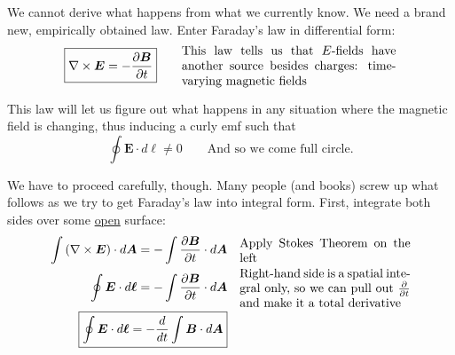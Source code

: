 \documentclass{article}
\numberwithin{equation}{section}
\newcommand{\rockandroll}[1][]{%
    \tikz \fill [scale=1ex/500,yscale=1,#1] svg "M3263 7664 c-94 -35 -191 -161 -208 -270 -15 -101 51 -340 173 -622 56 -129 69 -168 71 -217 3 -112 57 -456 102 -657 10 -48 19 -119 19 -158 0 -88 22 -248 66 -470 18 -96 34 -178 34 -182 0 -4 -45 42 -100 102 -124 135 -167 170 -255 212 -130 60 -280 48 -376 -32 -97 -79 -139 -192 -146 -396 l-6 -142 -68 68 c-191 191 -437 197 -625 15 -63 -62 -74 -100 -81 -297 -3 -76 -9 -138 -12 -138 -3 1 -22 22 -43 48 -20 26 -89 108 -155 182 -65 74 -149 178 -187 230 -38 52 -116 156 -173 230 -87 114 -113 157 -167 276 -230 512 -463 751 -667 683 -169 -57 -143 -331 81 -844 99 -227 128 -278 400 -700 43 -66 103 -165 135 -220 68 -118 241 -375 408 -605 124 -170 137 -196 137 -267 0 -85 83 -644 121 -811 6 -26 17 -105 25 -177 36 -308 129 -596 312 -962 144 -287 345 -606 493 -784 21 -25 65 -103 97 -175 33 -71 110 -232 171 -358 l111 -229 143 6 c78 3 590 16 1137 28 547 12 996 23 998 24 1 1 -13 27 -33 56 -117 177 -512 1052 -599 1327 -35 111 -34 162 13 492 73 510 91 717 91 1061 0 124 -5 286 -10 360 -26 330 -100 823 -185 1219 -63 299 -72 344 -94 520 -25 191 -82 423 -168 680 -36 107 -76 242 -89 299 -29 129 -76 275 -159 496 -35 94 -66 190 -70 215 -24 166 -181 554 -285 705 -106 153 -255 224 -377 179z m148 -45 c55 -19 125 -75 175 -142 54 -71 195 -355 249 -502 21 -55 47 -140 60 -190 12 -49 45 -154 74 -233 61 -169 134 -419 151 -517 7 -38 39 -153 71 -254 95 -293 158 -568 184 -803 l6 -57 -151 0 c-119 0 -315 -15 -327 -25 -1 -1 87 -2 195 -2 108 -1 217 -5 242 -10 52 -11 40 24 115 -337 67 -323 122 -656 154 -937 36 -306 44 -478 38 -795 -6 -326 -19 -487 -72 -900 -44 -335 -44 -367 -4 -492 68 -212 284 -719 469 -1100 l108 -222 -31 -5 c-18 -3 -148 -7 -289 -9 l-257 -5 -59 62 c-95 100 -183 239 -327 518 -52 101 -95 179 -95 175 0 -14 118 -266 187 -397 74 -142 161 -280 204 -326 l30 -31 -197 -6 c-109 -4 -248 -7 -310 -7 l-113 0 -32 58 c-58 101 -361 597 -371 607 -13 13 0 -13 85 -165 146 -261 267 -493 262 -499 -4 -3 -145 -9 -313 -13 -169 -4 -360 -8 -424 -11 -79 -3 -121 0 -127 7 -5 6 -82 155 -172 331 -121 238 -194 368 -285 505 -423 642 -658 1189 -699 1625 -4 39 -26 178 -51 310 -51 282 -91 553 -100 680 -7 89 -8 91 -59 160 -200 272 -431 609 -491 720 -21 39 -72 122 -113 185 -292 451 -382 616 -494 910 -127 332 -149 531 -64 594 43 32 127 28 195 -9 140 -77 316 -330 462 -667 41 -92 69 -138 167 -266 65 -84 143 -188 173 -230 30 -43 118 -149 195 -237 207 -236 222 -257 235 -340 6 -38 20 -84 31 -102 l21 -33 -54 -59 c-30 -32 -79 -94 -109 -137 -96 -138 -90 -137 27 5 71 86 149 154 170 149 6 -2 43 -32 81 -69 65 -61 69 -67 61 -95 -13 -45 0 -123 34 -194 39 -80 188 -233 294 -300 58 -36 134 -111 134 -132 0 -3 -17 -8 -38 -12 -92 -14 -472 -153 -579 -211 -27 -14 -41 -24 -32 -21 9 2 115 37 235 76 121 39 271 84 334 100 l115 30 115 -115 c63 -63 124 -122 135 -130 19 -14 18 -16 -30 -57 -136 -116 -383 -418 -485 -593 -31 -53 -23 -45 110 120 141 175 168 205 293 333 126 127 168 158 196 143 19 -11 19 -13 -16 -63 -69 -102 -164 -334 -259 -637 -56 -177 -137 -491 -130 -499 3 -2 12 25 22 60 31 111 190 579 239 703 63 160 147 332 182 373 25 30 34 34 90 37 65 3 151 36 209 80 l32 25 94 -57 c51 -32 94 -60 96 -63 1 -3 21 -35 44 -70 58 -90 190 -219 269 -263 80 -45 106 -49 31 -5 -109 63 -246 221 -295 339 -11 27 -30 44 -73 69 -70 39 -211 133 -309 205 -54 40 -83 54 -120 59 -147 21 -351 90 -495 167 -205 111 -370 287 -394 421 -21 116 92 236 274 293 123 39 619 29 845 -16 117 -23 100 -13 525 -314 378 -267 721 -495 746 -495 6 0 -323 244 -471 349 -49 36 -92 66 -95 68 -2 2 11 16 30 31 135 103 293 290 365 433 24 47 15 36 -46 -56 -64 -96 -239 -276 -326 -334 -60 -40 -64 -41 -87 -26 l-25 17 34 52 c40 63 128 236 185 366 82 185 78 188 -12 10 -73 -144 -179 -326 -217 -370 l-26 -31 -137 97 c-122 87 -136 100 -127 117 27 49 -6 561 -46 721 -17 67 -67 166 -98 193 -14 12 -10 2 11 -28 67 -99 82 -169 102 -474 11 -180 13 -319 4 -328 -4 -3 -16 8 -28 25 -26 38 -82 84 -116 93 -20 6 -16 1 15 -22 74 -55 126 -128 113 -162 -1 -5 -35 12 -74 38 -106 71 -266 105 -561 118 -127 5 -153 9 -157 22 -8 26 -44 238 -58 341 -17 132 -17 440 1 510 29 114 88 197 174 242 33 18 59 22 127 23 80 0 92 -3 162 -38 69 -33 99 -60 304 -265 221 -221 244 -241 158 -137 -22 28 -46 59 -51 70 -28 53 -103 577 -103 720 0 117 -147 871 -189 974 -51 122 -129 360 -151 456 -39 178 -21 281 65 369 67 68 148 91 226 65z m-1034 -2620 c78 -30 129 -66 201 -144 l60 -66 7 -77 c4 -42 17 -154 31 -249 13 -94 24 -176 24 -181 0 -5 -53 -12 -117 -15 -185 -8 -317 -59 -415 -160 l-48 -48 -52 48 c-79 72 -126 124 -143 159 -34 71 -42 377 -13 523 31 162 285 276 465 210z m331 -1646 c36 -13 46 -23 68 -68 24 -52 112 -161 121 -151 3 3 -9 22 -26 43 -29 37 -76 131 -69 138 2 2 37 -4 78 -15 41 -10 99 -22 129 -26 47 -6 69 -17 158 -81 57 -41 103 -77 103 -81 0 -12 -83 -59 -133 -76 -127 -42 -196 -12 -373 167 -71 73 -140 147 -153 165 l-23 33 38 -16 c22 -10 58 -24 82 -32z";%
}
\begin{document}
\begin{figure}[H]
\centering
{}
\label{fig:27:region}
\end{figure}

We cannot derive what happens from what we currently know. We need a brand new, empirically obtained law. Enter Faraday's law in differential form:
\begin{equation*}
    \boxed{\nabla \times \bm{E} = -\frac{\partial \bm{B}}{\partial t}} \qquad \parbox[c]{0.5\textwidth}{This law tells us that $E$-fields have another source besides charges: time-varying magnetic fields}
\end{equation*}

This law will let us figure out what happens in any situation where the magnetic field is changing, thus inducing a curly emf such that
\begin{equation*}
    \oint \bm{E} \cdot d\bm{\ell} \neq 0 \qquad \text{And so we come full circle.}
\end{equation*}

We have to proceed carefully, though. Many people (and books) screw up what follows as we try to get Faraday's law into integral form. First, integrate both sides over some \underline{open} surface:
\begin{align*}
    \int \left( \nabla \times \bm{E} \right) \cdot d\bm{A} = -\int \frac{\partial \bm{B}}{\partial t} \cdot d\bm{A} && \parbox[c]{0.4\textwidth}{Apply Stokes Theorem on the left} \\
    \oint \bm{E} \cdot d\bm{\ell} = -\int \frac{\partial \bm{B}}{\partial t} \cdot d\bm{A} && \parbox[c]{0.4\textwidth}{Right-hand side is a spatial integral only, so we can pull out $\frac{\partial}{\partial t}$ and make it a total derivative} \\
    \boxed{\oint \bm{E} \cdot d\bm{\ell} = -\frac{d}{dt} \int \bm{B} \cdot d\bm{A}}
\end{align*}
\end{document}
